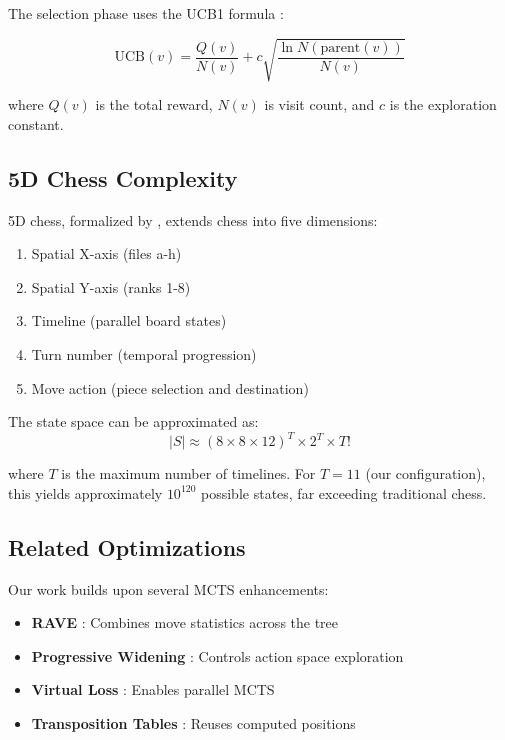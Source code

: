 \documentclass[11pt,a4paper]{article}
\begin{document}
The selection phase uses the UCB1 formula \cite{auer2002finite}:

\begin{equation}
\text{UCB}(v) = \frac{Q(v)}{N(v)} + c\sqrt{\frac{\ln N(\text{parent}(v))}{N(v)}}
\end{equation}

where $Q(v)$ is the total reward, $N(v)$ is visit count, and $c$ is the exploration constant.

\subsection{5D Chess Complexity}

5D chess, formalized by \cite{5dchess2020}, extends chess into five dimensions:
\begin{enumerate}
    \item Spatial X-axis (files a-h)
    \item Spatial Y-axis (ranks 1-8)
    \item Timeline (parallel board states)
    \item Turn number (temporal progression)
    \item Move action (piece selection and destination)
\end{enumerate}

The state space can be approximated as:
\begin{equation}
|S| \approx (8 \times 8 \times 12)^T \times 2^T \times T!
\end{equation}

where $T$ is the maximum number of timelines. For $T=11$ (our configuration), this yields approximately $10^{120}$ possible states, far exceeding traditional chess.

\subsection{Related Optimizations}

Our work builds upon several MCTS enhancements:

\begin{itemize}
    \item \textbf{RAVE} \cite{gelly2007combining}: Combines move statistics across the tree
    \item \textbf{Progressive Widening} \cite{coulom2006efficient}: Controls action space exploration
    \item \textbf{Virtual Loss} \cite{chaslot2008parallel}: Enables parallel MCTS
    \item \textbf{Transposition Tables} \cite{childs2008transpositions}: Reuses computed positions
\end{itemize}
\end{document}
